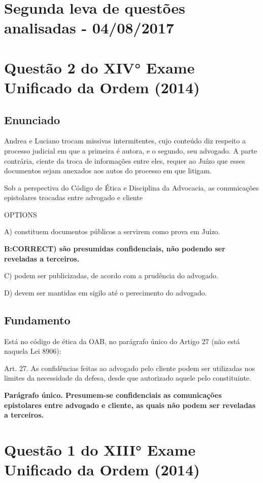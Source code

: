 \documentclass[12pt]{article}
\begin{document}
\section*{Segunda leva de questões analisadas - 04/08/2017} 


\section{Questão 2 do XIV° Exame Unificado da Ordem (2014)}

\subsection{Enunciado}

Andrea e Luciano trocam missivas intermitentes, cujo 
conteúdo diz respeito a processo judicial em que a primeira é 
autora, e o segundo, seu advogado. A parte contrária, ciente 
da troca de informações entre eles, requer ao Juízo que esses 
documentos sejam anexados aos autos do processo em que 
litigam. 
 
Sob a perspectiva do Código de Ética e Disciplina da 
Advocacia, as comunicações epistolares trocadas entre 
advogado e cliente 

OPTIONS

A) constituem documentos públicos a servirem como prova 
em Juízo. 

\textbf{B:CORRECT) são presumidas confidenciais, não podendo ser reveladas a terceiros. }

C) podem ser publicizadas, de acordo com a prudência do 
advogado. 

D) devem ser mantidas em sigilo até o perecimento do 
advogado.

\subsection{Fundamento}

Está no código de ética da OAB, no parágrafo único do Artigo 27 (não está naquela Lei 8906):

Art. 27. As  confidências  feitas  ao  advogado  pelo  cliente  podem  ser  utilizadas  nos limites da necessidade da defesa, desde que autorizado aquele pelo constituinte.  

\textbf{Parágrafo   único.   Presumem-se   confidenciais   as   comunicações   epistolares   entre advogado e cliente, as quais não podem ser reveladas a terceiros.}



\section{Questão 1 do XIII° Exame Unificado da Ordem (2014)}
\end{document}
